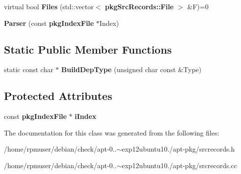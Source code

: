 \begin{DoxyCompactItemize}
\item 
virtual bool {\bfseries \-Files} (std\-::vector$<$ {\bf pkg\-Src\-Records\-::\-File} $>$ \&\-F)=0\label{classpkgSrcRecords_1_1Parser_a23ef9319da9fe64e010cc1cb3cb65642}

\item 
{\bfseries \-Parser} (const {\bf pkg\-Index\-File} $\ast$\-Index)\label{classpkgSrcRecords_1_1Parser_ad58d802b9e8baa3424c8a2851b886ba3}

\end{DoxyCompactItemize}
\subsection*{\-Static \-Public \-Member \-Functions}
\begin{DoxyCompactItemize}
\item 
static const char $\ast$ {\bfseries \-Build\-Dep\-Type} (unsigned char const \&\-Type)\label{classpkgSrcRecords_1_1Parser_a986a7256fa5cd957a409bbf613cf49a7}

\end{DoxyCompactItemize}
\subsection*{\-Protected \-Attributes}
\begin{DoxyCompactItemize}
\item 
const {\bf pkg\-Index\-File} $\ast$ {\bfseries i\-Index}\label{classpkgSrcRecords_1_1Parser_a4c8afaaf06415c382bc5f8db74644f6d}

\end{DoxyCompactItemize}


\-The documentation for this class was generated from the following files\-:\begin{DoxyCompactItemize}
\item 
/home/rpmuser/debian/check/apt-\/0..$\sim$exp12ubuntu10./apt-\/pkg/srcrecords.\-h\item 
/home/rpmuser/debian/check/apt-\/0..$\sim$exp12ubuntu10./apt-\/pkg/srcrecords.\-cc\end{DoxyCompactItemize}
